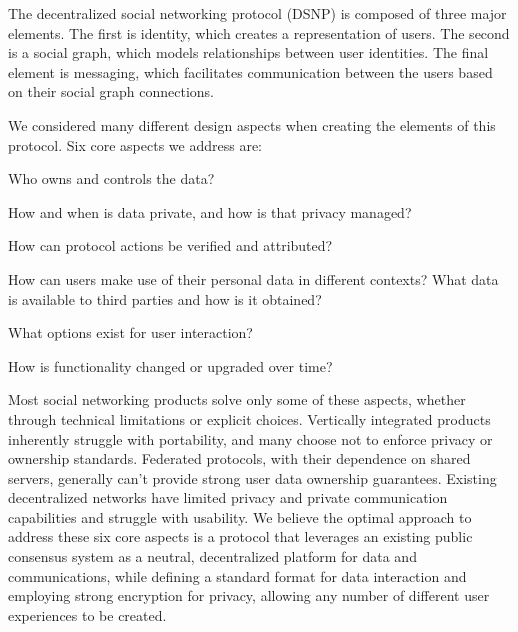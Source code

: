 \documentclass[12pt,letterpaper]{article}
\providecommand{\tightlist}{%
\setlength{\itemsep}{0pt}\setlength{\parskip}{0pt}}
\begin{document}
The decentralized social networking protocol (DSNP) is composed of three major elements.
The first is identity, which creates a representation of users. The second is a social
graph, which models relationships between user identities. The final element is messaging,
which facilitates communication between the users based on their social graph connections.

\begin{samepage}
	We considered many different design aspects when creating the elements of
	this protocol. Six core aspects we address are:

	\begin{description}
		\tightlist
		\item[Ownership:]
		      Who owns and controls the data?
		\item[Privacy:]
		      How and when is data private, and how is that privacy managed?
		\item[Authenticity:]
		      How can protocol actions be verified and attributed?
		\item[Portability:]
		      How can users make use of their personal data in different contexts?
		      What data is available to third parties and how is it obtained?
		\item[Usability:]
		      What options exist for user interaction?
		\item[Extensibility:]
		      How is functionality changed or upgraded over time?
	\end{description}
\end{samepage}

Most social networking products solve only some of these aspects, whether through technical
limitations or explicit choices. Vertically integrated products inherently struggle with
portability, and many choose not to enforce privacy or ownership standards. Federated
protocols, with their dependence on shared servers, generally can't provide strong user data
ownership guarantees. Existing decentralized networks have limited privacy and private
communication capabilities and struggle with usability. We believe the optimal approach to
address these six core aspects is a protocol that leverages an existing public consensus
system as a neutral, decentralized platform for data and communications, while defining a
standard format for data interaction and employing strong encryption for privacy, allowing
any number of different user experiences to be created.
\end{document}
